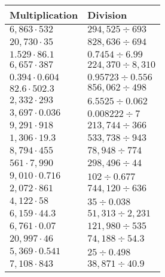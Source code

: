 \begin{longtable}[]{@{}ll@{}}
\toprule
Multiplication & Division\tabularnewline
\midrule
\endhead
\(6,863\cdot532\) & \(294,525÷693\)\tabularnewline
\(20,730\cdot35\) & \(828,636÷694\)\tabularnewline
\(1.529\cdot86.1\) & \(0.7454÷6.99\)\tabularnewline
\(6,657\cdot387\) & \(224,370÷8,310\)\tabularnewline
\(0.394\cdot0.604\) & \(0.95723÷0.556\)\tabularnewline
\(82.6\cdot502.3\) & \(856,062÷498\)\tabularnewline
\(2,332\cdot293\) & \(6.5525÷0.062\)\tabularnewline
\(3,697\cdot0.036\) & \(0.008222÷7\)\tabularnewline
\(9,291\cdot918\) & \(213,744÷366\)\tabularnewline
\(1,306\cdot19.3\) & \(533,738÷943\)\tabularnewline
\(8,794\cdot455\) & \(78,948÷774\)\tabularnewline
\(561\cdot7,990\) & \(298,496÷44\)\tabularnewline
\(9,010\cdot0.716\) & \(102÷0.677\)\tabularnewline
\(2,072\cdot861\) & \(744,120÷636\)\tabularnewline
\(4,122\cdot58\) & \(35÷0.038\)\tabularnewline
\(6,159\cdot44.3\) & \(51,313÷2,231\)\tabularnewline
\(6,761\cdot0.07\) & \(121,980÷535\)\tabularnewline
\(20,997\cdot46\) & \(74,188÷54.3\)\tabularnewline
\(5,369\cdot0.541\) & \(25÷0.498\)\tabularnewline
\(7,108\cdot843\) & \(38,871÷40.9\)\tabularnewline
\bottomrule
\end{longtable}
